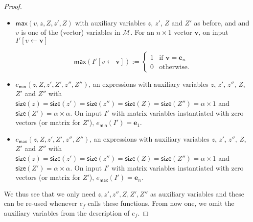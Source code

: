 \begin{proof}
\begin{itemize}
	\item $\textsf{max}(v,z,Z,z',Z)$ with auxiliary variables $z$, $z'$, $Z$ and $Z'$ as before, and 
	and $v$ is one of the (vector) variables in $\mathcal{M}$. For an $n\times 1$ vector $\mathbf{v}$, 
	on input $I'[v\gets \mathbf{v}]$
	
	$$\mathsf{max}(I'[v\gets\mathbf{v}]):=\begin{cases} 1 & \text{if $\mathbf{v}=\mathbf{e}_{n}$}\\
		0 & \text{otherwise}.
		\end{cases}$$
	\item $e_{\mathsf{min}}(z,Z,z',Z',z'',Z'')$, an expressions with
	auxiliary variables $z$, $z'$, $z''$, $Z$, $Z'$ and $Z''$ with 
	$\mathsf{size}(z)=\mathsf{size}(z')=\mathsf{size}(z'')=\mathsf{size}(Z)=\mathsf{size}(Z'')=\alpha\times 1$ 
	and $\mathsf{size}(Z')=\alpha\times\alpha$. On input $I'$ with 
	matrix variables instantiated with zero vectors (or matrix for $Z'$),
 	 $e_{\mathsf{min}}(I')=\mathbf{e}_1$. 
	\item $e_{\mathsf{max}}(z,Z,z',Z',z'',Z'')$, an expressions with
	auxiliary variables $z$, $z'$, $z''$, $Z$, $Z'$ and $Z''$ with 
	$\mathsf{size}(z)=\mathsf{size}(z')=\mathsf{size}(z'')=\mathsf{size}(Z)=\mathsf{size}(Z'')=\alpha\times 1$ 
	and $\mathsf{size}(Z')=\alpha\times\alpha$. On input $I'$ with 
	matrix variables instantiated with zero vectors (or matrix for $Z'$),
 	 $e_{\mathsf{max}}(I')=\mathbf{e}_n$. 
	 		
\end{itemize}
We thus see that we only need $z,z',z'',Z,Z',Z''$ as auxiliary variables and these can be re-used 
whenever $e_f$ calls these functions. From now one, we omit the auxiliary variables from the description 
of $e_f$.



\end{proof}
